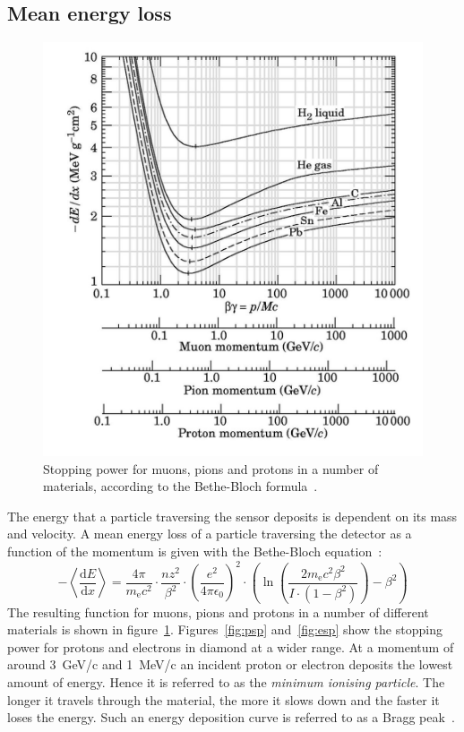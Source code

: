 \subsection{Mean energy loss}
\begin{figure}[!t]
\begin{center}
\includegraphics[width=0.6\linewidth]{02_pulse_formation/pics/Bethe2}
\caption{Stopping power for muons, pions and protons in a number of materials, according to the Bethe-Bloch formula~\cite{BETHE:00001,BB:00000}.}
\label{fig:bb2}
\end{center}
\end{figure}
The energy that a particle traversing the sensor deposits is dependent on its mass and velocity. A mean energy loss of a particle traversing the detector as a function of the momentum is given with the Bethe-Bloch equation~\cite{BETHE:00001}: 
\begin{equation}
-\left\langle\frac{\mathrm{d}E}{\mathrm{d}x}\right\rangle = \frac{4\pi}{m_\mathrm{e}c^2}  \cdot \frac{nz^2}{\beta^2}  \cdot  \left(\frac{e^2}{4\pi\epsilon_\mathrm{0}}\right)^2  \cdot  \left( \ln \left(\frac{2m_\mathrm{e}c^2\beta^2}{I\cdot(1-\beta^2)}\right)-\beta^2  \right)
\label{eq:bethebloch}
\end{equation}
The resulting function for muons, pions and protons in a number of different materials is shown in figure~\ref{fig:bb2}. Figures~\ref{fig:psp} and~\ref{fig:esp} show the stopping power for protons and electrons in diamond at a wider range. At a momentum of around 3~GeV/c and 1~MeV/c an incident proton or electron deposits the lowest amount of energy. Hence it is referred to as the \emph{minimum ionising particle}. The longer it travels through the material, the more it slows down and the faster it loses the energy. Such an energy deposition curve is referred to as a Bragg peak~\cite{Kotte:172812}.



